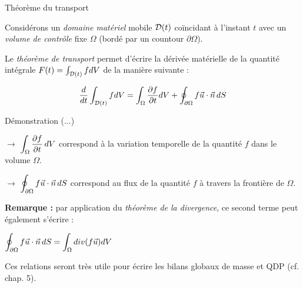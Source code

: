 \begin{frame}{Théorème du transport}

\small

Considérons un {\em domaine matériel } mobile ${\cal D} (t)$ coïncidant à l'instant $t$ avec un {\em volume de contrôle } fixe $\Omega$ (bordé par un countour $\partial \Omega$).

Le {\em théorème de transport} permet d'écrire la dérivée matérielle de la quantité intégrale $F(t) =  \int_{{\cal D}(t)} f d V$ de la manière suivante :

$$
\frac{d}{dt} \int_{{\cal D}(t)} f d V  = \int_\Omega \frac{\partial f } {\partial t} dV + \oint_{\partial\Omega} f\vec{u}\cdot\vec{n}\, dS
$$

\smallskip
{\color{vert} Démonstration (...)} 


\bigskip
\pause




%

$\longrightarrow$ $ \displaystyle \int_\Omega \displaystyle \frac{\partial f}{\partial t}\, dV$ correspond à la variation temporelle de la quantité $f$
dans le volume $\Omega$.

\smallskip

$\longrightarrow$ $\displaystyle \oint_{\partial\Omega} f\vec{u}\cdot\vec{n}\, dS$ correspond au \textcolor{rouge}{flux}
de la quantité $f$ à travers la frontière de $\Omega$.

\bigskip
\pause

{\bf Remarque : }  par application du {\em théorème de la divergence}, ce second terme peut également s'écrire :

$\displaystyle \oint_{\partial\Omega} f\vec{u}\cdot\vec{n}\, dS = \int_{\Omega} div ( f\vec{u}) dV $


\bigskip
Ces relations seront très utile pour écrire les bilans globaux de masse et QDP (cf. chap. 5).


\end{frame}

